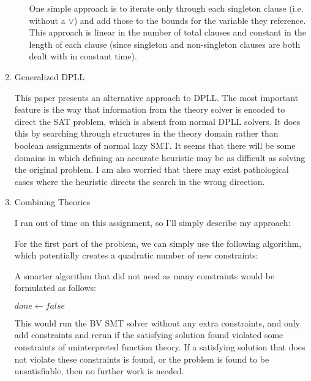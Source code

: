 \documentclass{article}
\begin{document}
\begin{enumerate}
\begin{enumerate}
  One simple approach is to iterate only through each singleton clause (i.e. without a $\vee$) and add those to the bounds for the variable they reference.  This approach is linear in the number of total clauses and constant in the length of each clause (since singleton and non-singleton clauses are both dealt with in constant time).
    \end{enumerate}
  \item Generalized DPLL

This paper presents an alternative approach to DPLL.  The most important feature is the way that information from the theory solver is encoded to direct the SAT problem, which is absent from normal DPLL solvers.
It does this by searching through structures in the theory domain rather than boolean assignments of normal lazy SMT.
It seems that there will be some domains in which defining an accurate heuristic may be as difficult as solving the original problem.  I am also worried that there may exist pathological cases where the heuristic directs the search in the wrong direction.
  \item Combining Theories

    I ran out of time on this assignment, so I'll simply describe my approach:

    For the first part of the problem, we can simply use the following algorithm, which potentially creates a quadratic number of new constraints:
\begin{algorithm}
\end{algorithm}

A smarter algorithm that did not need as many constraints would be formulated as follows:
\begin{algorithm}
  $done \leftarrow false$ \;
\end{algorithm}
\newpage

This would run the BV SMT solver without any extra constraints, and only
add constraints and rerun if the satisfying solution found violated some
constraints of uninterpreted function theory.  If a satisfying solution that
does not violate these constraints is found, or the problem is found to be
unsatisfiable, then no further work is needed.
\end{enumerate}

%
%
\end{document}
